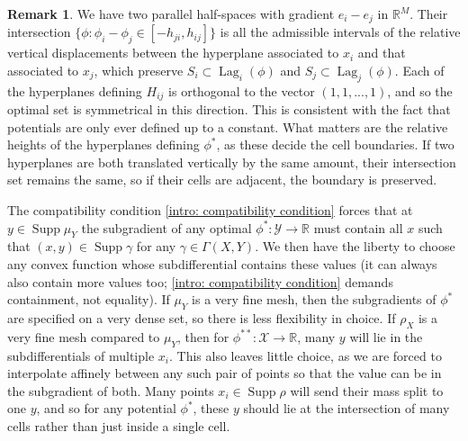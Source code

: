 \documentclass[11pt, oneside, titlepage]{book}
\theoremstyle{plain}
\theoremstyle{definition}
\newtheorem{remark}[theorem]{Remark}
\newcommand{\R}{\mathbb{R}}
\newcommand{\X}{\mathcal{X}}
\newcommand{\Y}{\mathcal{Y}}
\DeclareMathOperator{\supp}{Supp}
\DeclareMathOperator{\lag}{Lag}
\begin{document}
\begin{remark}
We have two parallel half-spaces with gradient $e_i - e_j$ in $\R^M$. Their intersection $\{ \phi: \phi_i - \phi_j \in [-h_{ji}, h_{ij}]\}$ is all the admissible intervals of the relative vertical displacements between the hyperplane associated to $x_i$ and that associated to $x_j$, which preserve $S_i \subset \lag_i(\phi)$ and $S_j \subset \lag_j(\phi)$. Each of the hyperplanes defining $H_{ij}$ is orthogonal to the vector $(1, 1, ..., 1)$, and so the optimal set is symmetrical in this direction. This is consistent with the fact that potentials are only ever defined up to a constant. What matters are the relative heights of the hyperplanes defining $\phi^*$, as these decide the cell boundaries. If two hyperplanes are both translated vertically by the same amount, their intersection set remains the same, so if their cells are adjacent, the boundary is preserved.

The compatibility condition \eqref{intro: compatibility condition} forces that at $y \in \supp \mu_Y$ the subgradient of any optimal $\phi^*: \Y \to \R$ must contain all $x$ such that $(x, y) \in \supp \gamma$ for any $\gamma \in \Gamma(X, Y)$. We then have the liberty to choose any convex function whose subdifferential contains these values (it can always also contain more values too; \eqref{intro: compatibility condition} demands containment, not equality). If $\mu_Y$ is a very fine mesh, then the subgradients of $\phi^*$ are specified on a very dense set, so there is less flexibility in choice. If $\rho_X$ is a very fine mesh compared to $\mu_Y$, then for $\phi^{**} : \X \to \R$, many $y$ will lie in the subdifferentials of multiple $x_i$. This also leaves little choice, as we are forced to interpolate affinely between any such pair of points so that the value can be in the subgradient of both.  
Many points $x_i \in \supp \rho$ will send their mass split to one $y$, and so for any potential $\phi^*$, these $y$ should lie at the intersection of many cells rather than just inside a single cell. 
\end{remark}
\end{document}
